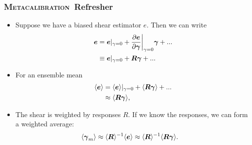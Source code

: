 \documentclass{beamer}
\newcommand{\Mcal}{\textsc{Metacalibration}}
\newcommand{\mcalR}{\mbox{\boldmath $R$}}
\newcommand{\vecg}{\mbox{\boldmath $\gamma$}}
\newcommand{\vest}{\mbox{\boldmath $e$}}
\begin{document}
\frame
{
    \frametitle{\Mcal\ Refresher}

 
    \begin{itemize}

        \item Suppose we have a biased shear estimator {\color{gold} \vest}.  Then we can write
            {\color{gold}
\begin{align} \label{eq:Eexpand}
    \vest &= \vest|_{\gamma=0} + \frac{ \partial \vest }{ \partial \vecg}\bigg|_{\gamma=0} \vecg  + ... \nonumber \\
          &\equiv \vest|_{\gamma=0} + \mbox{\mcalR}\vecg  + ...
\end{align}
            } 

        \item For an ensemble mean
            {\color{gold}
                \begin{align}
                    \langle \vest \rangle &= \langle \vest \rangle |_{\gamma=0} + \langle \mbox{\mcalR} \vecg \rangle + ... \nonumber \\
                                          &\approx \langle \mbox{\mcalR} \vecg \rangle,
                \end{align}
                }

            \item The shear is weighted by responses {\color{cadetblue} \mcalR}.  If we know the
                responses, we can form a weighted average:
            {\color{gold}
\begin{align} \label{eq:rcorr}
    \langle \vecg_m \rangle &\approx \langle \mbox{\mcalR} \rangle^{-1}  \langle \vest \rangle \approx \langle \mbox{\mcalR} \rangle^{-1} \langle \mcalR \vecg \rangle.
\end{align}
            }
    \end{itemize}
}
\end{document}
